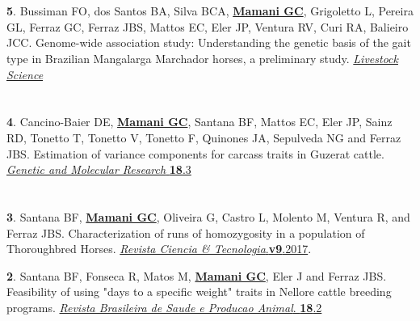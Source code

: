\documentclass[margin,line,10pt]{res}
\newenvironment{list1}{
  \begin{list}{\ding{113}}{%
      \setlength{\itemsep}{0in}
      \setlength{\parsep}{0in} \setlength{\parskip}{0in}
      \setlength{\topsep}{0in} \setlength{\partopsep}{0in} 
      \setlength{\leftmargin}{0.17in}}}{\end{list}}
\begin{document}
\begin{resume}
\section{}

\begin{list1}
\item [{\bf 5}.] Bussiman FO, dos Santos BA, Silva BCA, {\bf \underline{Mamani GC}}, Grigoletto L, Pereira GL, Ferraz GC, Ferraz JBS, Mattos EC, Eler JP, Ventura RV, Curi RA, Balieiro JCC. Genome-wide association study: Understanding the genetic basis of the gait type in Brazilian Mangalarga Marchador horses, a preliminary study. 
\textcolor{blue}{\href{https://www.sciencedirect.com/science/article/abs/pii/S1871141319306493}{{\it Livestock Science} }}
\end{list1}

\section{}

\begin{list1}
\item [{\bf 4}.] Cancino-Baier DE, {\bf \underline{Mamani GC}}, Santana BF, Mattos EC, Eler JP, Sainz RD, Tonetto T, Tonetto V, Tonetto F, Quinones JA, Sepulveda NG and Ferraz JBS. Estimation of variance components for carcass traits in Guzerat cattle. 
\textcolor{}{\href{https://www.geneticsmr.com/articles/estimation-variance-components-carcass-and-production-traits-guzerat-cattle}{{\it Genetic and Molecular Research} {\bf 18}.3}}
\end{list1}

\section{}

\begin{list1}
\item [{\bf 3}.]  Santana BF, {\bf \underline{Mamani GC}}, Oliveira G, Castro L, Molento M, Ventura R, and Ferraz JBS. Characterization of runs of homozygosity in a population of Thoroughbred Horses.   
\textcolor{black}{\href{http://www.citec.fatecjab.edu.br/index.php/files/article/view/1161}{{\it Revista Ciencia & Tecnologia}.{\bf v9}.2017}. } 
\vspace{0.5cm}

\item [{\bf 2}.] Santana BF, Fonseca R, Matos M, {\bf \underline{Mamani GC}}, Eler J and Ferraz JBS. Feasibility of using "days to a specific weight" traits in Nellore cattle breeding programs.   
\textcolor{black}{\href{http://www.scielo.br/scielo.php?script=sci_arttext&pid=S1519-99402017000200260}{{\it Revista Brasileira de Saude e Producao Animal}. {\bf 18}.2}}
\end{list1}
\vspace{0.5cm}


\end{resume}
\end{document}
